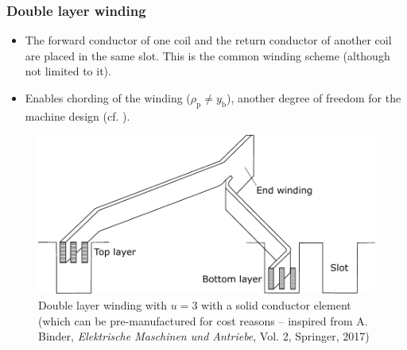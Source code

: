 \begin{frame}
	\frametitle{Double layer winding}
	\begin{itemize}
		\item The forward conductor of one coil and the return conductor of another coil are placed in the same slot. This is the common winding scheme (although not limited to it).
		\item Enables chording of the winding ($\rho_\mathrm{p}\neq y_\mathrm{b}$), another degree of freedom for the machine design (cf. ).
	\end{itemize}
    \begin{figure}
        \centering
        \includegraphics[height=0.45\textheight]{fig/lec03/Double_layer_winding.pdf}
        \caption{Double layer winding with $u=3$ with a solid conductor element (which can be pre-manufactured for cost reasons -- inspired from A. Binder, \textit{Elektrische Maschinen und Antriebe}, Vol. 2, Springer, 2017)}
    \end{figure}
\end{frame}

